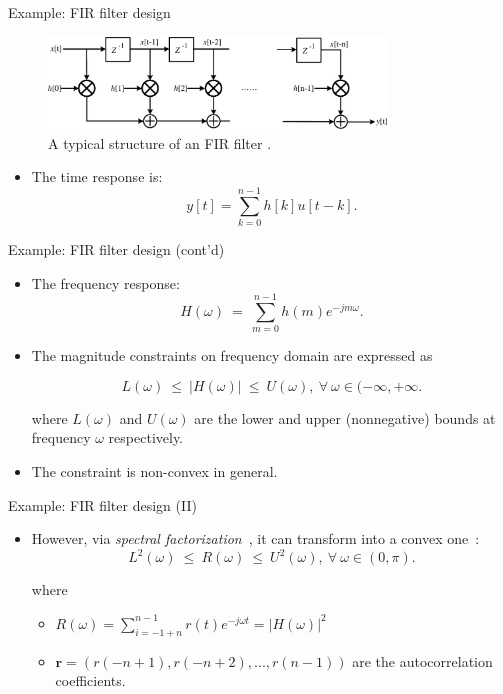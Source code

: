\documentclass[
  ignorenonframetext,
  aspectratio=169,
  serif,onlymath]{beamer}
\providecommand{\tightlist}{%
  \setlength{\itemsep}{0pt}\setlength{\parskip}{0pt}}
\begin{document}
\begin{frame}{Example: FIR filter design}
\protect\hypertarget{example-fir-filter-design}{}

\begin{figure}
\centering
\includegraphics[width=0.8\textwidth,height=\textheight]{ellipsoid.files/fir_strctr.pdf}
\caption{A typical structure of an FIR filter \citet{mitra2006digital}.}
\end{figure}

\begin{itemize}
\tightlist
\item
  The time response is: \[y[t] = \sum_{k=0}^{n-1}{h[k]u[t-k]}. \]
\end{itemize}

\end{frame}

\begin{frame}{Example: FIR filter design (cont'd)}
\protect\hypertarget{example-fir-filter-design-contd}{}

\begin{itemize}
\item
  The frequency response:
  \[H(\omega)~=~\sum_{m=0}^{n-1}{h(m)e^{-jm\omega}}. \]
\item
  The magnitude constraints on frequency domain are expressed as

  \[L(\omega)~\leq~|H(\omega)|~\leq~U(\omega),~\forall~\omega\in(-\infty,+\infty. \]

  where \(L(\omega)\) and \(U(\omega)\) are the lower and upper
  (nonnegative) bounds at frequency \(\omega\) respectively.
\item
  The constraint is non-convex in general.
\end{itemize}

\end{frame}

\begin{frame}{Example: FIR filter design (II)}
\protect\hypertarget{example-fir-filter-design-ii}{}

\begin{itemize}
\item
  However, via \emph{spectral
  factorization}~\citep{goodman1997spectral}, it can transform into a
  convex one~\citep{wu1999fir}:
  \[L^2(\omega)~\leq~R(\omega)~\leq~U^2(\omega),~\forall~\omega\in(0,\pi). \]

  where

  \begin{itemize}
  \tightlist
  \item
    \(R(\omega)=\sum_{i=-1+n}^{n-1}{r(t)e^{-j{\omega}t}}=|H(\omega)|^2\)
  \item
    \(\mathbf{r}=(r(-n+1),r(-n+2),...,r(n-1))\) are the autocorrelation
    coefficients.
  \end{itemize}
\end{itemize}

\end{frame}
\end{document}
